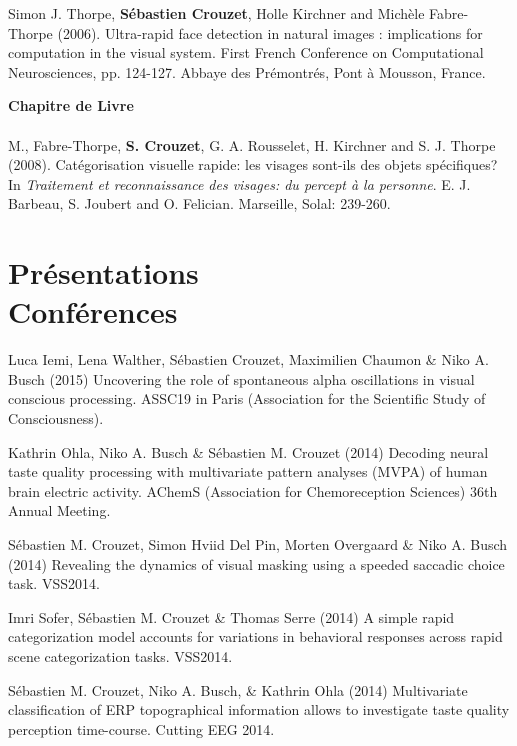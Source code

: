 \documentclass[margin,line]{resume}
\begin{document}
\begin{resume}
	\vspace{-2mm} Simon J. Thorpe, \textbf{Sébastien Crouzet}, Holle Kirchner and Michèle Fabre-Thorpe (2006). Ultra-rapid face detection in natural images : implications for computation in the visual system. First French Conference on Computational Neurosciences, pp. 124-127. Abbaye des Prémontrés, Pont à Mousson, France.


\vspace{3mm}	
\textbf{Chapitre de Livre}\\\\
	M., Fabre-Thorpe, \textbf{S. Crouzet}, G. A. Rousselet, H. Kirchner and S. J. Thorpe (2008). Catégorisation visuelle rapide: les visages sont-ils des 	objets spécifiques? In \textsl{Traitement et reconnaissance des visages: du percept à la personne}. E. J. Barbeau, S. Joubert and O. Felician. Marseille, Solal: 239-260.


\vspace{3mm}	
    \section{\mysidestyle Présentations\\Conférences}

	\footnotesize %
	
	Luca Iemi, Lena Walther, Sébastien Crouzet, Maximilien Chaumon \& Niko A. Busch (2015) Uncovering the role of spontaneous alpha oscillations in visual conscious processing. ASSC19 in Paris (Association for the Scientific Study of Consciousness).
	
	\vspace{-2mm} Kathrin Ohla, Niko A. Busch \& Sébastien M. Crouzet (2014) Decoding neural taste quality processing with multivariate pattern analyses (MVPA) of human brain electric activity. AChemS (Association for Chemoreception Sciences) 36th Annual Meeting.

	\vspace{-2mm} Sébastien M. Crouzet, Simon Hviid Del Pin, Morten Overgaard \& Niko A. Busch (2014) Revealing the dynamics of visual masking using a speeded saccadic choice task. VSS2014.

	\vspace{-2mm} Imri Sofer, Sébastien M. Crouzet \& Thomas Serre (2014) A simple rapid categorization model accounts for variations in behavioral responses across rapid scene categorization tasks. VSS2014.

	\vspace{-2mm} Sébastien M. Crouzet, Niko A. Busch, \& Kathrin Ohla (2014) Multivariate classification of ERP topographical information allows to investigate taste quality perception time-course. Cutting EEG 2014.
	

\end{resume}
\end{document}

